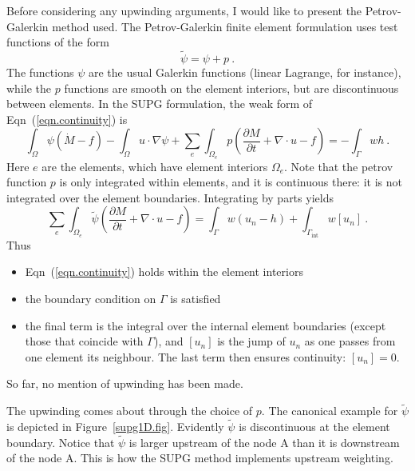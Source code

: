 \documentclass[]{scrreprt}
\begin{document}
Before considering any upwinding arguments, I would like to present
the Petrov-Galerkin method used.  The Petrov-Galerkin finite element
formulation uses test functions of the form
\begin{equation}
\tilde{\psi} = \psi + p \ .
\end{equation}
The functions $\psi$ are the usual Galerkin functions (linear
Lagrange, for instance), while the $p$ functions are smooth on the
element interiors, but are discontinuous between elements.  In the SUPG
formulation, the weak form of Eqn~(\ref{eqn.continuity}) is
\begin{equation}
\int_{\Omega}\psi (\dot{M} - f) - \int_{\Omega} u\cdot\nabla\psi
+ \sum_{e}\int_{\Omega_{e}}p \left( \frac{\partial M}{\partial t} + \nabla\cdot u
- f \right) = -\int_{\Gamma}w h \ .
\end{equation}
Here $e$ are the elements, which have element
interiors $\Omega_{e}$.  Note that the petrov function $p$ is only
integrated within elements, and it is continuous there: it is not
integrated over the element boundaries.  Integrating by parts yields
\begin{equation}
\sum_{e}\int_{\Omega_{e}}\tilde{\psi} \left( \frac{\partial M}{\partial t} + \nabla\cdot u
- f \right) = \int_{\Gamma}w (u_{n} - h) +
\int_{\Gamma_{\mathrm{int}}}w [u_{n}]\ .
\label{supg.general.eqn}
\end{equation}
Thus
\begin{itemize}
\item Eqn~(\ref{eqn.continuity}) holds within the element interiors
\item the boundary condition on $\Gamma$ is satisfied
\item the final term is the integral over the internal element
  boundaries (except those that coincide with $\Gamma$), and $[u_{n}]$
  is the jump of $u_{n}$ as one passes from one element its neighbour.
  The last term then ensures continuity: $[u_{n}] = 0$.
\end{itemize}
So far, no mention of upwinding has been made.

The upwinding comes about through the choice of $p$.  The canonical
example for $\tilde{\psi}$ is depicted in Figure~\ref{supg1D.fig}.
Evidently $\tilde{\psi}$ is discontinuous at the element boundary.
Notice that $\tilde{\psi}$ is larger upstream of the node A than it is
downstream of the node A.  This is how the SUPG method implements
upstream weighting.
\end{document}
